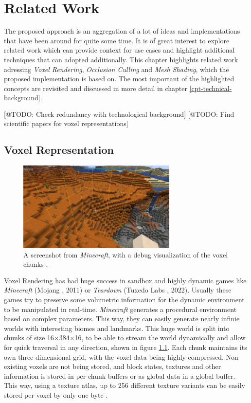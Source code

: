 \chapter{Related Work} \label{cpt-related-work}

The proposed approach is an aggregation of a lot of ideas and implementations that have been 
around for quite some time. It is of great interest to explore related work which can provide 
context for use cases and highlight additional techniques that can adopted additionally. This 
chapter highlights related work adressing \emph{Voxel Rendering}, \emph{Occlusion Culling} 
and \emph{Mesh Shading}, which the proposed implementation is based on. The most important of 
the highlighted concepts are revisited and discussed in more detail in chapter 
\ref{cpt-technical-background}. 

[@TODO: Check redundancy with technological background]
[@TODO: Find scientific papers for voxel representations]

\section{Voxel Representation} \label{sec-voxel-representation}

\begin{figure}[h]
    \centering
    \includegraphics[width=300px]{images/graphics/minecraft-chunks.jpg}
    \caption{A screenshot from \emph{Minecraft}, with a debug visualization of the voxel chunks \cite{Palm2022}.}
    \label{fig:minecraft-chunks}
\end{figure}

\noindent
Voxel Rendering has had huge success in sandbox and highly dynamic games like \emph{Minecraft} (Mojang 
\cite{Mojang2024}, 2011) or \emph{Teardown} (Tuxedo Labs \cite{TuxedoLabs2022}, 2022). Usually these games try 
to preserve some volumetric information for the dynamic environment to be manipulated in real-time. \emph{Minecraft} 
generates a procedural environment based on complex parameters. This way, they can easily generate nearly infinie 
worlds with interesting biomes and landmarks. This huge world is split into chunks of size 16×384×16, to be able to 
stream the world dynamically and allow for quick traversal in any direction, shown in figure \ref{fig:minecraft-chunks}.
Each chunk maintains its own three-dimensional grid, with the voxel data being highly compressed. Non-existing voxels 
are not being stored, and block states, textures and other information is stored in per-chunk buffers or as global 
data in a global buffer. This way, using a texture atlas, up to 256 different texture variants can be easily stored 
per voxel by only one byte \cite{Bergensten2012, MinecraftFandom2021}. \\

